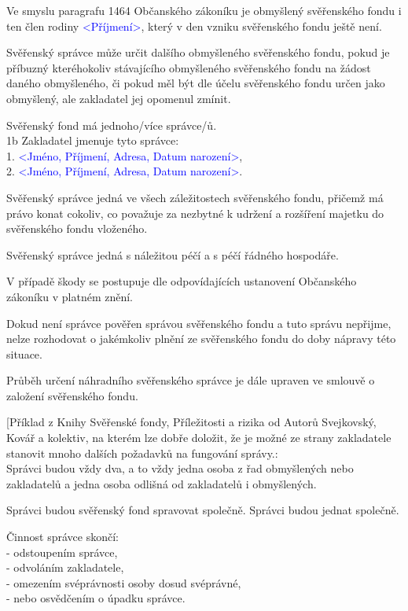 \documentclass[parskip=half]{scrreprt}
\begin{document}
\begin{contract}
Ve smyslu paragrafu 1464 Občanského zákoníku je obmyšlený svěřenského fondu i ten člen rodiny \textcolor{blue}{<Příjmení>}, který v den vzniku svěřenského fondu ještě není.


Svěřenský správce může určit dalšího obmyšleného svěřenského fondu, pokud je příbuzný kteréhokoliv stávajícího obmyšleného svěřenského fondu na žádost daného obmyšleného, či pokud měl být dle účelu svěřenského fondu určen jako obmyšlený, ale zakladatel jej opomenul zmínit.


Svěřenský fond má jednoho/více správce/ů.\\
1b Zakladatel jmenuje tyto správce:\\
1. \textcolor{blue}{<Jméno, Příjmení, Adresa, Datum narození>},\\
2. \textcolor{blue}{<Jméno, Příjmení, Adresa, Datum narození>}.

Svěřenský správce jedná ve všech záležitostech svěřenského fondu, přičemž má právo konat cokoliv, co považuje za nezbytné k udržení a rozšíření majetku do svěřenského fondu vloženého.

Svěřenský správce jedná s náležitou péčí a s péčí řádného hospodáře.

V případě škody se postupuje dle odpovídajících ustanovení Občanského zákoníku v platném znění.

Dokud není správce pověřen správou svěřenského fondu a tuto správu nepřijme, nelze rozhodovat o jakémkoliv plnění ze svěřenského fondu do doby nápravy této situace.

Průběh určení náhradního svěřenského správce je dále upraven ve smlouvě o založení svěřenského fondu.

\parnumberfalse
[Příklad z Knihy Svěřenské fondy, Příležitosti a rizika od Autorů Svejkovský, Kovář a kolektiv, na kterém lze dobře doložit, že je možné ze strany zakladatele stanovit mnoho dalších požadavků na fungování správy.: \\
Správci budou vždy dva, a to vždy jedna osoba z řad obmyšlených nebo zakladatelů a jedna osoba odlišná od zakladatelů i obmyšlených.

Správci budou svěřenský fond spravovat společně. Správci budou jednat společně.

Činnost správce skončí:\\
- odstoupením správce,\\
- odvoláním zakladatele,\\
- omezením svéprávnosti osoby dosud svéprávné,\\
- nebo osvědčením o úpadku správce.


\end{contract}
\end{document}
